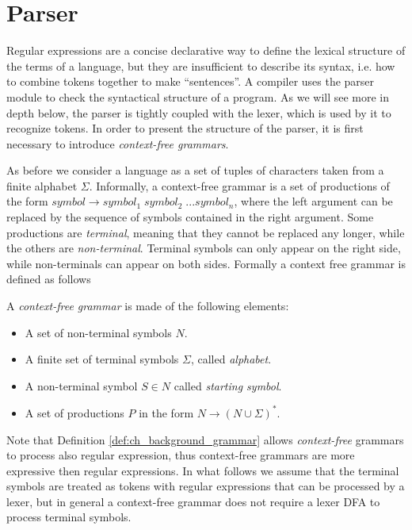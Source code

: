 \section{Parser}
\label{sec:ch_background_parser}
Regular expressions are a concise declarative way to define the lexical structure of the terms of a language, but they are insufficient to describe its syntax, i.e. how to combine tokens together to  make ``sentences''. A compiler uses the parser module to check the syntactical structure of a program. As we will see more in depth below, the parser is tightly coupled with the lexer, which is used by it to recognize tokens. In order to present the structure of the parser, it is first necessary to introduce \textit{context-free grammars}.

As before we consider a language as a set of tuples of characters taken from a finite alphabet $\Sigma$. Informally, a context-free grammar is a set of productions of the form $symbol \rightarrow symbol_{1} \; symbol_{2} \; ... symbol_{n}$, where the left argument can be replaced by the sequence of symbols contained in the right argument. Some productions are \textit{terminal}, meaning that they cannot be replaced any longer, while the others are \textit{non-terminal}. Terminal symbols can only appear on the right side, while non-terminals can appear on both sides. Formally a context free grammar is defined as follows

\begin{definition}
	\label{def:ch_background_grammar}
	A \textit{context-free grammar} is made of the following elements:
	
	\begin{itemize}[noitemsep]
		\item A set of non-terminal symbols $N$.
		\item A finite set of terminal symbols $\Sigma$, called \textit{alphabet}.
		\item A non-terminal symbol $S \in N$ called \textit{starting symbol}.
		\item A set of productions $P$ in the form $N \rightarrow (N \cup \Sigma)^{*}$.
	\end{itemize}
\end{definition}

\noindent
Note that Definition \ref{def:ch_background_grammar} allows \textit{context-free} grammars to process also regular expression, thus context-free grammars are more expressive then regular expressions. In what follows we assume that the terminal symbols are treated as tokens with regular expressions that can be processed by a lexer, but in general a context-free grammar does not require a lexer DFA to process terminal symbols.

